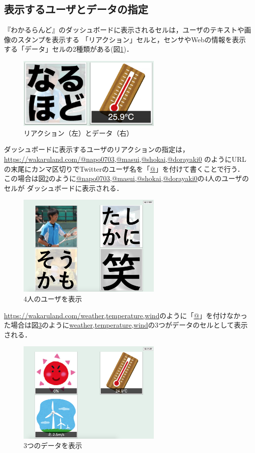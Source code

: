 \subsection{表示するユーザとデータの指定}
『わかるらんど』のダッシュボードに表示されるセルは，ユーザのテキストや画像のスタンプを表示する
「リアクション」セルと，センサやWebの情報を表示する「データ」セルの2種類がある(図\ref{cell})．

\begin{figure}[h]
\centering
\includegraphics[width=7cm]{images/cell.png}
\caption{リアクション（左）とデータ（右）}
\label{cell}
\end{figure}

ダッシュボードに表示するユーザのリアクションの指定は，
\url{https://wakaruland.com/@napo0703,@masui,@shokai,@dorayaki0}
のようにURLの末尾にカンマ区切りでTwitterのユーザ名を「\url{@}」を付けて書くことで行う．
この場合は図\ref{n_m_s_d}のように\url{@napo0703,@masui,@shokai,@dorayaki0}の4人のユーザのセルが
ダッシュボードに表示される．

\begin{figure}[h]
\centering
\includegraphics[width=7cm]{images/n_m_s_d.png}
\caption{4人のユーザを表示}
\label{n_m_s_d}
\end{figure}

\url{https://wakaruland.com/weather,temperature,wind}のように「\url{@}」を付けなかった場合は図\ref{w_t_w}のように\url{weather,temperature,wind}の3つがデータのセルとして表示される．

\begin{figure}[h]
\centering
\includegraphics[width=7cm]{images/w_t_w.png}
\caption{3つのデータを表示}
\label{w_t_w}
\end{figure}

